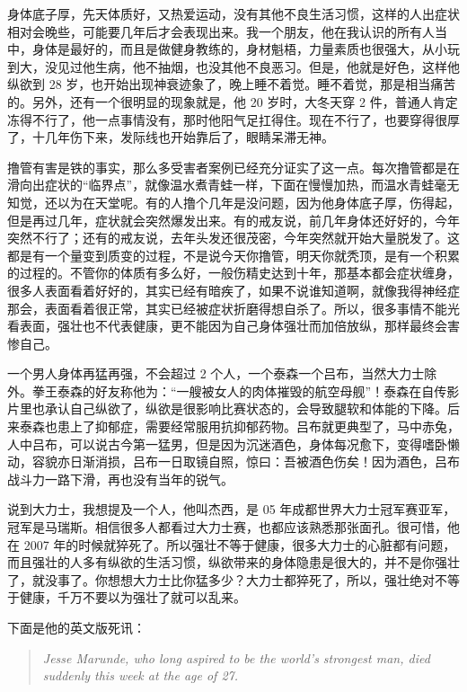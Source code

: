 \documentclass{ctexart}
\begin{document}
身体底子厚，先天体质好，又热爱运动，没有其他不良生活习惯，这样的人出症状相对会晚些，可能要几年后才会表现出来。我一个朋友，他在我认识的所有人当中，身体是最好的，而且是做健身教练的，身材魁梧，力量素质也很强大，从小玩到大，没见过他生病，他不抽烟，也没其他不良恶习。但是，他就是好色，这样他纵欲到 28 岁，也开始出现神衰迹象了，晚上睡不着觉。睡不着觉，那是相当痛苦的。另外，还有一个很明显的现象就是，他 20 岁时，大冬天穿 2 件，普通人肯定冻得不行了，他一点事情没有，那时他阳气足扛得住。现在不行了，也要穿得很厚了，十几年伤下来，发际线也开始靠后了，眼睛呆滞无神。

撸管有害是铁的事实，那么多受害者案例已经充分证实了这一点。每次撸管都是在滑向出症状的“临界点”，就像温水煮青蛙一样，下面在慢慢加热，而温水青蛙毫无知觉，还以为在天堂呢。有的人撸个几年是没问题，因为他身体底子厚，伤得起，但是再过几年，症状就会突然爆发出来。有的戒友说，前几年身体还好好的，今年突然不行了；还有的戒友说，去年头发还很茂密，今年突然就开始大量脱发了。这都是有一个量变到质变的过程，不是说今天你撸管，明天你就秃顶，是有一个积累的过程的。不管你的体质有多么好，一般伤精史达到十年，那基本都会症状缠身，很多人表面看着好好的，其实已经有暗疾了，如果不说谁知道啊，就像我得神经症那会，表面看着很正常，其实已经被症状折磨得想自杀了。所以，很多事情不能光看表面，强壮也不代表健康，更不能因为自己身体强壮而加倍放纵，那样最终会害惨自己。

一个男人身体再猛再强，不会超过 2 个人，一个泰森一个吕布，当然大力士除外。拳王泰森的好友称他为：“一艘被女人的肉体摧毁的航空母舰”！泰森在自传影片里也承认自己纵欲了，纵欲是很影响比赛状态的，会导致腿软和体能的下降。后来泰森也患上了抑郁症，需要经常服用抗抑郁药物。吕布就更典型了，马中赤兔，人中吕布，可以说古今第一猛男，但是因为沉迷酒色，身体每况愈下，变得嗜卧懒动，容貌亦日渐消损，吕布一日取镜自照，惊曰：吾被酒色伤矣！因为酒色，吕布战斗力一路下滑，再也没有当年的锐气。

说到大力士，我想提及一个人，他叫杰西，是 05 年成都世界大力士冠军赛亚军，冠军是马瑞斯。相信很多人都看过大力士赛，也都应该熟悉那张面孔。很可惜，他在 2007 年的时候就猝死了。所以强壮不等于健康，很多大力士的心脏都有问题，而且强壮的人多有纵欲的生活习惯，纵欲带来的身体隐患是很大的，并不是你强壮了，就没事了。你想想大力士比你猛多少？大力士都猝死了，所以，强壮绝对不等于健康，千万不要以为强壮了就可以乱来。

下面是他的英文版死讯：

\begin{quote}\it
    Jesse Marunde, who long aspired to be the world's strongest man, died suddenly this week at the age of 27.
\end{quote}
\end{document}
